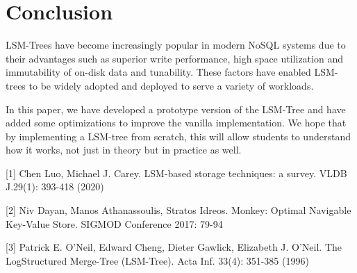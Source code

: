 \documentclass[sigconf]{acmart}
\begin{document}
    \section{Conclusion}
    
    LSM-Trees have become increasingly popular in modern NoSQL systems due to their advantages such as superior write performance, high space utilization and immutability of on-disk data and tunability. These factors have enabled LSM-trees to be widely adopted and deployed to serve a variety of workloads.
    
    In this paper, we have developed a prototype version of the LSM-Tree and have added some optimizations to improve the vanilla implementation. We hope that by implementing a LSM-tree from scratch, this will allow students to understand how it works, not just in theory but in practice as well.

        {
        
        

        [1] Chen Luo, Michael J. Carey. LSM-based storage techniques: a survey. VLDB J.29(1): 393-418 (2020)

        [2] Niv Dayan, Manos Athanassoulis, Stratos Idreos. Monkey: Optimal Navigable
        Key-Value Store. SIGMOD Conference 2017: 79-94

        [3] Patrick E. O'Neil, Edward Cheng, Dieter Gawlick, Elizabeth J. O'Neil. The LogStructured Merge-Tree (LSM-Tree). Acta Inf. 33(4): 351-385 (1996)
    }
\end{document}
